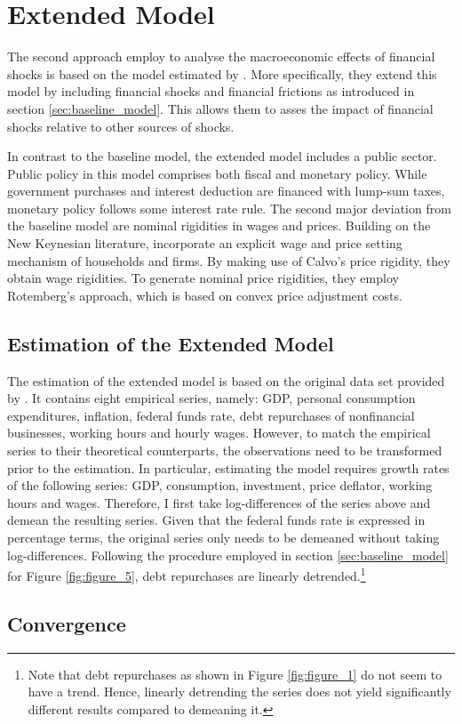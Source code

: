 \section{Extended Model}
\label{sec:extended_model}

The second approach \citeauthor{JERMANNfinancial} employ to analyse the macroeconomic effects of financial shocks is based on the model estimated by \citet{SMETSshocks}. More specifically, they extend this model by including financial shocks and financial frictions as introduced in section \ref{sec:baseline_model}. This allows them to  asses the impact of financial shocks relative to other sources of shocks. 

In contrast to the baseline model, the extended model includes a public sector. Public policy in this model comprises both fiscal and monetary policy. While government purchases and  interest deduction are financed with lump-sum taxes, monetary policy follows some  interest rate rule. The second major deviation from the baseline model are nominal rigidities in wages and prices. Building on the New Keynesian literature, \citeauthor{JERMANNfinancial} incorporate an explicit wage and price setting mechanism of households and firms. By making use of Calvo's price rigidity, they obtain wage rigidities. To generate nominal price rigidities, they employ Rotemberg's approach, which is based on convex price adjustment costs.


\subsection{Estimation of the Extended Model}
\label{sec:extended_model_estimation}



The estimation of the extended model is based on the original data set provided by \citeauthor{JERMANNfinancial}. It contains eight empirical series, namely: GDP, personal consumption expenditures, inflation, federal funds rate, debt repurchases of nonfinancial businesses, working hours and hourly wages. However, to match the empirical series to their theoretical counterparts, the observations need to be transformed prior to the estimation. In particular, estimating the model requires growth rates of the following series: GDP, consumption, investment, price deflator, working hours and wages. Therefore, I first take log-differences of the series above  and demean the resulting series. Given that the federal funds rate is expressed in percentage terms, the original series only needs to be demeaned without taking log-differences. Following the procedure employed in section \ref{sec:baseline_model} for Figure \ref{fig:figure_5}, debt repurchases are linearly detrended.\footnote{Note that debt repurchases as shown in Figure \ref{fig:figure_1} do not seem to have a trend. Hence, linearly detrending the series does not yield significantly different results  compared to demeaning it.}


\subsection{Convergence}
\label{sec:convergence}
